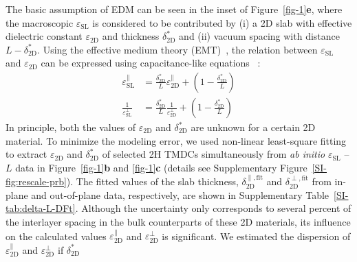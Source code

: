 The basic assumption of EDM can be
seen in the inset of Figure~\ref{fig-1}\textbf{e}, where the macroscopic
$\varepsilon_{\mathrm{SL}}$ is considered to be contributed by (i) a
2D slab with effective dielectric constant $\varepsilon_{\mathrm{2D}}$
and thickness $\delta^{*}_{\mathrm{2D}}$ and (ii) vacuum spacing with
distance $L-\delta^{*}_{\mathrm{2D}}$. Using the effective medium theory
(EMT)~\cite{Aspnes_1982,Markel_2016}, the relation between
$\varepsilon_{\mathrm{SL}}$ and $\varepsilon_{\mathrm{2D}}$ can be
expressed using capacitance-like
equations~\cite{Matthes_2016,Laturia_2018} :
\begin{subequations}
  \begin{eqnarray}
    \label{eq:emt-1}
    {\displaystyle \varepsilon_{\mathrm{SL}}^{\parallel}} &= {\displaystyle \frac{\delta^{*}_{\mathrm{2D}}}{L} \varepsilon_{\mathrm{2D}}^{\parallel} + \left(1 - \frac{\delta^{*}_{\mathrm{2D}}}{L} \right)}\\
     \label{eq:emt-2}
    {\displaystyle \frac{1}{\varepsilon_{\mathrm{SL}}^{\perp}}} &= {\displaystyle \frac{\delta^{*}_{\mathrm{2D}}}{L} \frac{1}{\varepsilon_{\mathrm{2D}}^{\perp}} + \left(1 - \frac{\delta^{*}_{\mathrm{2D}}}{L} \right)}
  \end{eqnarray}
\end{subequations}
In principle, both the values of $\varepsilon_{\mathrm{2D}}$ and
$\delta^{*}_{\mathrm{2D}}$ are unknown for a certain 2D material. To
minimize the modeling error, we used non-linear least-square fitting
to extract $\varepsilon_{\mathrm{2D}}$ and $\delta^{*}_{\mathrm{2D}}$ of
selected 2H TMDCs simultaneously from \textit{ab initio}
$\varepsilon_{\mathrm{SL}}$ -- $L$ data in
Figure~\ref{fig-1}\textbf{b} and \ref{fig-1}\textbf{c} (details see
Supplementary Figure~\ref{SI-fig:rescale-prb}). The fitted values of
the slab thickness, $\delta_{\mathrm{2D}}^{\parallel, \mathrm{fit}}$
and $\delta_{\mathrm{2D}}^{\perp, \mathrm{fit}}$ from in-plane and
out-of-plane data, respectively, are shown in Supplementary
Table~\ref{SI-tab:delta-L-DFt}.
%
%
Although the uncertainty only corresponds to several percent of the
interlayer spacing in the bulk counterparts of these 2D materials, its
influence on the calculated values
$\varepsilon_{\mathrm{2D}}^{\parallel}$ and
$\varepsilon_{\mathrm{2D}}^{\perp}$ is significant. We estimated the
dispersion of $\varepsilon_{\mathrm{2D}}^{\parallel}$ and
$\varepsilon_{\mathrm{2D}}^{\perp}$ if $\delta^{*}_{\mathrm{2D}}$
